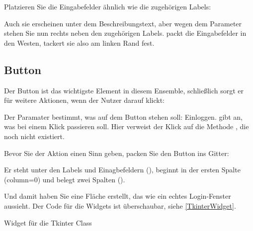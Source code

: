 Platzieren Sie die Eingabefelder ähnlich wie die zugehörigen Labels:

\medskip



\medskip

Auch sie erscheinen unter dem Beschreibungstext, aber wegen dem Parameter  stehen Sie nun rechts neben den zugehörigen Labels.  packt die Eingabefelder in den Westen, tackert sie also am linken Rand fest.



\subsection{Button}

Der Button ist das wichtigste Element in diesem Ensemble, schließlich sorgt er für weitere Aktionen, wenn der Nutzer darauf klickt:

\medskip


\medskip

Der Paramater  bestimmt, was auf dem Button stehen soll: Einloggen.  gibt an, was bei einem Klick passieren soll. Hier verweist der Klick auf die Methode , die noch nicht existiert.

Bevor Sie der Aktion einen Sinn geben, packen Sie den Button ins Gitter:

\medskip


\medskip

Er steht unter den Labels und Einagbefeldern (), beginnt in der ersten Spalte (column=0) und belegt zwei Spalten ().

Und damit haben Sie eine Fläche erstellt, das wie ein echtes Login-Fenster aussieht. Der Code für die Widgets ist überschaubar, siehe \ref{TkinterWidget}.


\begin{code}
     
    \caption{Widget für die Tkinter Class}\label{TkinterWidget}
\end{code}   

